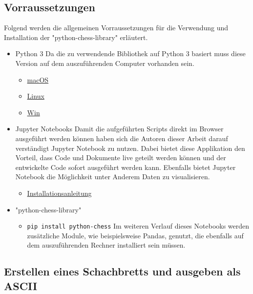 \subsection{Vorraussetzungen}\label{vorraussetzungen}

Folgend werden die allgemeinen Vorraussetzungen für die Verwendung und
Installation der "python-chess-library" erläutert.

\begin{itemize}
\tightlist
\item
  Python 3 Da die zu verwendende Bibliothek auf Python 3 basiert muss
  diese Version auf dem auszuführenden Computer vorhanden sein.

  \begin{itemize}
  \tightlist
  \item
    \href{https://wsvincent.com/install-python3-mac/}{macOS}
  \item
    \href{https://docs.python-guide.org/starting/install3/linux/}{Linux}
  \item
    \href{https://realpython.com/installing-python/}{Win}
  \end{itemize}
\item
  Jupyter Notebooks Damit die aufgeführten Scripts direkt im Browser
  ausgeführt werden können haben sich die Autoren dieser Arbeit darauf
  verständigt Jupyter Notebook zu nutzen. Dabei bietet diese Applikation
  den Vorteil, dass Code und Dokumente live geteilt werden können und
  der entwickelte Code sofort ausgeführt werden kann. Ebenfalls bietet
  Jupyter Notebook die Möglichkeit unter Anderem Daten zu visualisieren.

  \begin{itemize}
  \tightlist
  \item
    \href{https://jupyter.org/install}{Installationsanleitung}
  \end{itemize}
\item
  "python-chess-library"

  \begin{itemize}
  \tightlist
  \item
    \texttt{pip\ install\ python-chess} Im weiteren Verlauf dieses
    Notebooks werden zusätzliche Module, wie beispielsweise Pandas,
    genutzt, die ebenfalls auf dem auszuführenden Rechner installiert
    sein müssen.
  \end{itemize}
\end{itemize}

    \subsection{Erstellen eines Schachbretts und ausgeben als
ASCII}\label{erstellen-eines-schachbretts-und-ausgeben-als-ascii}

